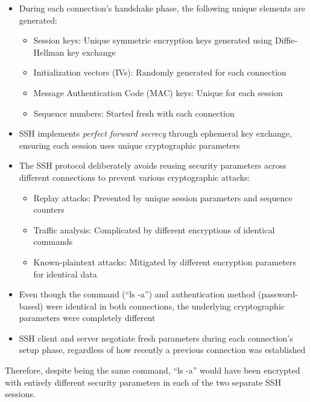 \documentclass[11pt]{article}
\begin{document}
\begin{description}
\begin{itemize}
        \item During each connection's handshake phase, the following unique elements are generated:
          \begin{itemize}
            \item Session keys: Unique symmetric encryption keys generated using Diffie-Hellman key exchange
            \item Initialization vectors (IVs): Randomly generated for each connection
            \item Message Authentication Code (MAC) keys: Unique for each session
            \item Sequence numbers: Started fresh with each connection
          \end{itemize}
          
        \item SSH implements \textit{perfect forward secrecy} through ephemeral key exchange, ensuring each session uses unique cryptographic parameters
        
        \item The SSH protocol deliberately avoids reusing security parameters across different connections to prevent various cryptographic attacks:
          \begin{itemize}
            \item Replay attacks: Prevented by unique session parameters and sequence counters
            \item Traffic analysis: Complicated by different encryptions of identical commands
            \item Known-plaintext attacks: Mitigated by different encryption parameters for identical data
          \end{itemize}
          
        \item Even though the command (``ls -a'') and authentication method (password-based) were identical in both connections, the underlying cryptographic parameters were completely different
          
        \item SSH client and server negotiate fresh parameters during each connection's setup phase, regardless of how recently a previous connection was established
    \end{itemize}
    
    Therefore, despite being the same command, ``ls -a'' would have been encrypted with entirely different security parameters in each of the two separate SSH sessions.



\end{description}
\end{document}
